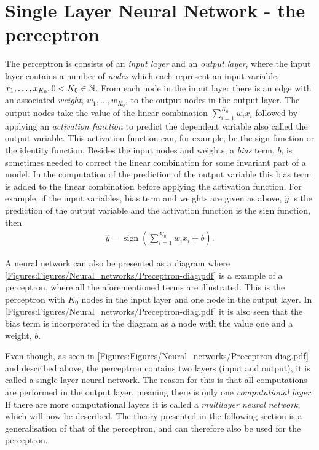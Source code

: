 \section{Single Layer Neural Network - the perceptron} 
The perceptron is consists of an \emph{input layer} and an \emph{output layer}, where the input layer contains a number of \emph{nodes} which each represent an input variable, $x_1, \ldots, x_{K_0}, 0 < K_0 \in \mathbb{N}$. From each node in the input layer there is an edge with an associated \emph{weight}, $w_1, \ldots, w_{K_0}$, to the output nodes in the output layer. The output nodes take the value of the linear combination $\sum_{i = 1}^{K_0} w_ix_i$ followed by applying an \emph{activation function} to predict the dependent variable also called the output variable. This activation function can, for example, be the sign function or the identity function. Besides the input nodes and weights, a \emph{bias} term, $b$, is sometimes needed to correct the linear combination for some invariant part of a model. In the computation of the prediction of the output variable this bias term is added to the linear combination before applying the activation function. For example, if the input variables, bias term and weights are given as above, $\hat{y}$ is the prediction of the output variable and the activation function is the sign function, then
\begin{align}\label{eq:sign_perceptron_output}
    \hat{y} =  \operatorname{sign}\left(\sum_{i=1}^{K_0} w_ix_i + b\right).
\end{align}
 
A neural network can also be presented as a diagram where \autoref{Figures:Figures/Neural_networks/Preceptron-diag.pdf} is a example of a perceptron, where all the aforementioned terms are illustrated. This is the perceptron with $K_0$ nodes in the input layer and one node in the output layer. In \autoref{Figures:Figures/Neural_networks/Preceptron-diag.pdf} it is also seen that the bias term is incorporated in the diagram as a node with the value one and a weight, $b$.


Even though, as seen in \autoref{Figures:Figures/Neural_networks/Preceptron-diag.pdf} and described above, the perceptron contains two layers (input and output), it is called a single layer neural network. The reason for this is that all computations are performed in the output layer, meaning there is only one \emph{computational layer}. If there are more computational layers it is called a \emph{multilayer neural network}, which will now be described. The theory presented in the following section is a generalisation of that of the perceptron, and can therefore also be used for the perceptron. 


